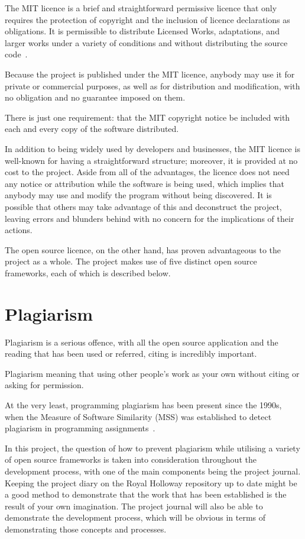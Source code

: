 \documentclass[]{final_report}
\begin{document}
The MIT licence is a brief and straightforward permissive licence that only requires the protection of copyright and the inclusion of licence declarations as obligations. It is permissible to distribute Licensed Works, adaptations, and larger works under a variety of conditions and without distributing the source code~\cite{choose_a_license_2022}.

Because the project is published under the MIT licence, anybody may use it for private or commercial purposes, as well as for distribution and modification, with no obligation and no guarantee imposed on them.

There is just one requirement: that the MIT copyright notice be included with each and every copy of the software distributed.

In addition to being widely used by developers and businesses, the MIT licence is well-known for having a straightforward structure; moreover, it is provided at no cost to the project.
Aside from all of the advantages, the licence does not need any notice or attribution while the software is being used, which implies that anybody may use and modify the program without being discovered. It is possible that others may take advantage of this and deconstruct the project, leaving errors and blunders behind with no concern for the implications of their actions.

The open source licence, on the other hand, has proven advantageous to the project as a whole. The project makes use of five distinct open source frameworks, each of which is described below.

\section{Plagiarism}

Plagiarism is a serious offence, with all the open source application and the reading that has been used or referred, citing is incredibly important.

Plagiarism meaning that using other people's work as your own without citing or asking for permission.

At the very least, programming plagiarism has been present since the 1990s, when the Measure of Software Similarity (MSS) was established to detect plagiarism in programming assignments~\cite{fraser2014collaboration}.

In this project, the question of how to prevent plagiarism while utilising a variety of open source frameworks is taken into consideration throughout the development process, with one of the main components being the project journal. Keeping the project diary on the Royal Holloway repository up to date might be a good method to demonstrate that the work that has been established is the result of your own imagination. The project journal will also be able to demonstrate the development process, which will be obvious in terms of demonstrating those concepts and processes.
\end{document}

